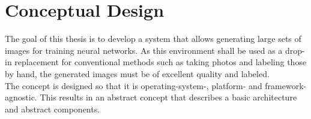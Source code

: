 
\chapter{Conceptual Design}
\label{chap:conceptual-design}
The goal of this thesis is to develop a system that allows generating large sets of images for training neural networks. As this environment shall be used as a drop-in replacement for conventional methods such as taking photos and labeling those by hand, the generated images must be of excellent quality and labeled.\\
The concept is designed so that it is operating-system-, platform- and framework-agnostic. This results in an abstract concept that describes a basic architecture and abstract components. 

